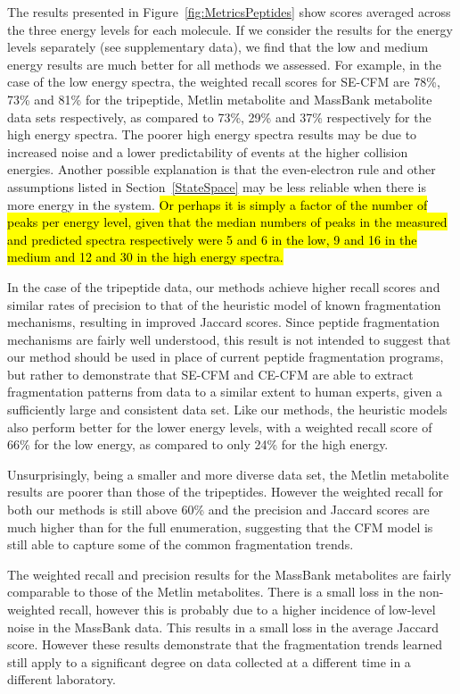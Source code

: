 The results presented in Figure~\ref{fig:MetricsPeptides} show scores averaged across the three energy levels for each molecule. If we consider the results for the energy levels separately (see supplementary data), we find that the low and medium energy results are much better for all methods we assessed.
For example, in the case of the low energy spectra, the weighted recall scores for SE-CFM are 78\%, 73\% and 81\% for the tripeptide, Metlin metabolite and MassBank metabolite data sets respectively, as compared to 73\%, 29\% and 37\% respectively for the high energy spectra.
The poorer high energy spectra results may be due to increased noise and a lower predictability of events at the higher collision energies. 
Another possible explanation is that the even-electron rule and other assumptions listed in Section~\ref{StateSpace} may be less reliable when there is more energy in the system. \hl{Or perhaps it is simply a factor of the number of peaks per energy level, given that the median numbers of peaks in the measured and predicted spectra respectively were 5 and 6 in the low, 9 and 16 in the medium and 12 and 30 in the high energy spectra. }

In the case of the tripeptide data, our methods achieve higher recall scores and similar rates of precision to that of the heuristic model of known fragmentation mechanisms, resulting in improved Jaccard scores.
Since peptide fragmentation mechanisms are fairly well understood, this result is not intended to suggest that our method should be used in place of current peptide fragmentation programs, but rather to demonstrate that SE-CFM and CE-CFM are able to extract fragmentation patterns from data to a similar extent to human experts, given a sufficiently large and consistent data set. Like our methods, the heuristic models also perform better for the lower energy levels, with a weighted recall score of 66\% for the low energy, as compared to only 24\% for the high energy.

Unsurprisingly, being a smaller and more diverse data set, the Metlin metabolite results are poorer than those of the tripeptides. However the weighted recall for both our methods is still above 60\% and the precision and Jaccard scores are much higher than for the full enumeration, suggesting that the CFM model is still able to capture some of the common fragmentation trends. 

The weighted recall and precision results for the MassBank metabolites are fairly comparable to those of the Metlin metabolites. There is a small loss in the non-weighted recall, however this is probably due to a higher incidence of low-level noise in the MassBank data. This results in a small loss in the average Jaccard score. However these results demonstrate that the fragmentation trends learned still apply to a significant degree on data collected at a different time in a different laboratory.




